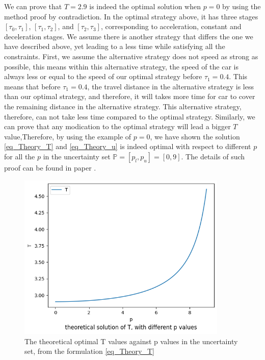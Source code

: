 \documentclass  [
  paper    = a4,
  BCOR     = 10mm,
  twoside,
  fontsize = 12pt,
  fleqn,
  toc      = bibnumbered,
  toc      = listofnumbered,
  numbers  = noendperiod,
  headings = normal,
  listof   = leveldown,
  version  = 3.03
]                                       {scrreprt}
\newcommand{\<}{\langle}
\renewcommand{\>}{\rangle}
\begin{document}
We can prove that $T=2.9$ is indeed the optimal solution when $p=0$ by using the method proof by contradiction. In the optimal strategy above, it has three stages $[\tau_0, \tau_1]$, $[\tau_1, \tau_2]$, and $[\tau_2, \tau_3]$, corresponding to acceleration, constant and deceleration stages. We assume there is another strategy that differs the one we have described above, yet leading to a less time while satisfying all the constraints. First, we assume the alternative strategy does not speed as strong as possible, this means within this alternative strategy, the speed of the car is always less or equal to the speed of our optimal strategy before $\tau_1=0.4$. This means that before $\tau_1=0.4$, the travel distance in the alternative strategy is less than our optimal strategy, and therefore, it will takes more time for car to cover the remaining distance in the alternative strategy. This alternative strategy, therefore, can not take less time compared to the optimal strategy. Similarly, we can prove that any modication to the optimal strategy will lead a bigger $T$ value,Therefore, by using the example of $p=0$, we have shown the solution \ref{eq_Theory_T} and \ref{eq_Theory_u} is indeed optimal with respect to different $p$ for all the $p$ in the uncertainty set $ \mathbb{P}=[p_l, p_u] =[0,9]$. The details of such proof can be found in paper \cite{MatSch22}. 


\begin{figure}[H]
	\centerline{\includegraphics[width=10cm]{theory_T_diff_p.png}}
	\caption{The theoretical optimal T values against p values in the uncertainty set, from the formulation \ref{eq_Theory_T}}
	\label{theory_T_diff_p}
\end{figure}
\end{document}

